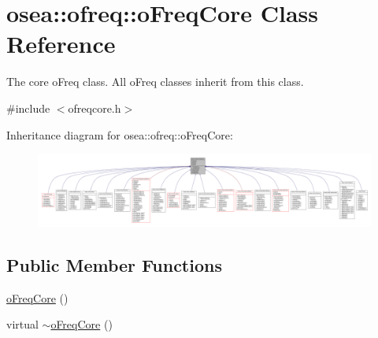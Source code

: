 \hypertarget{classosea_1_1ofreq_1_1o_freq_core}{\section{osea\-:\-:ofreq\-:\-:o\-Freq\-Core Class Reference}
\label{classosea_1_1ofreq_1_1o_freq_core}
}


The core o\-Freq class. All o\-Freq classes inherit from this class.  




{\ttfamily \#include $<$ofreqcore.\-h$>$}



Inheritance diagram for osea\-:\-:ofreq\-:\-:o\-Freq\-Core\-:\nopagebreak
\begin{figure}[H]
\begin{center}
\leavevmode
\includegraphics[width=350pt]{classosea_1_1ofreq_1_1o_freq_core__inherit__graph}
\end{center}
\end{figure}
\subsection*{Public Member Functions}
\begin{DoxyCompactItemize}
\item 
\hyperlink{classosea_1_1ofreq_1_1o_freq_core_a5c882c0d8e78706270e377b749a647f5}{o\-Freq\-Core} ()
\item 
virtual \hyperlink{classosea_1_1ofreq_1_1o_freq_core_aea5887547dbd17fc2d4f1a99fe217918}{$\sim$o\-Freq\-Core} ()
\end{DoxyCompactItemize}
